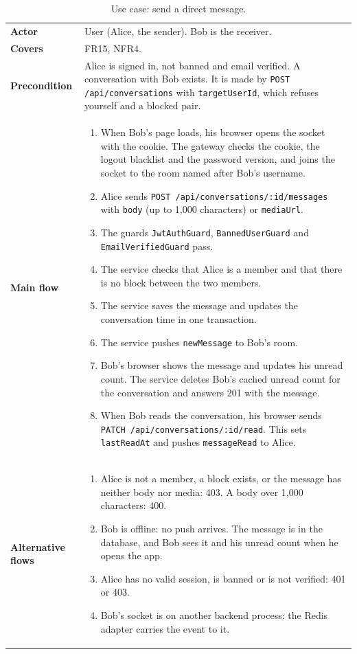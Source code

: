 {\small\singlespacing
\begin{longtable}{@{}>{\raggedright\arraybackslash}p{2.5cm} >{\raggedright\arraybackslash}p{\dimexpr\textwidth-2.5cm-2\tabcolsep\relax}@{}}
  \caption{Use case: send a direct message.}
  \label{tab:design-uc-dm}\\
  \toprule
  \textbf{Actor} & User (Alice, the sender). Bob is the receiver. \\
  \textbf{Covers} & FR15, NFR4. \\
  \midrule
  \textbf{Precondition} & Alice is signed in, not banned and email verified. A conversation with Bob exists. It is made by \texttt{POST /api/conversations} with \texttt{targetUserId}, which refuses yourself and a blocked pair. \\
  \midrule
  \textbf{Main flow} &
  \begin{enumerate}[nosep,leftmargin=*,label=\arabic*.]
    \item When Bob's page loads, his browser opens the socket with the cookie. The gateway checks the cookie, the logout blacklist and the password version, and joins the socket to the room named after Bob's username.
    \item Alice sends \texttt{POST /api/conversations/:id/messages} with \texttt{body} (up to 1,000 characters) or \texttt{mediaUrl}.
    \item The guards \texttt{JwtAuthGuard}, \texttt{BannedUserGuard} and \texttt{EmailVerifiedGuard} pass.
    \item The service checks that Alice is a member and that there is no block between the two members.
    \item The service saves the message and updates the conversation time in one transaction.
    \item The service pushes \texttt{newMessage} to Bob's room.
    \item Bob's browser shows the message and updates his unread count. The service deletes Bob's cached unread count for the conversation and answers 201 with the message.
    \item When Bob reads the conversation, his browser sends \texttt{PATCH /api/conversations/:id/read}. This sets \texttt{lastReadAt} and pushes \texttt{messageRead} to Alice.
  \end{enumerate} \\
  \midrule
  \textbf{Alternative flows} &
  \begin{enumerate}[nosep,leftmargin=*,label=A\arabic*.]
    \item Alice is not a member, a block exists, or the message has neither body nor media: 403. A body over 1,000 characters: 400.
    \item Bob is offline: no push arrives. The message is in the database, and Bob sees it and his unread count when he opens the app.
    \item Alice has no valid session, is banned or is not verified: 401 or 403.
    \item Bob's socket is on another backend process: the Redis adapter carries the event to it.
  \end{enumerate} \\
  \bottomrule
\end{longtable}}

